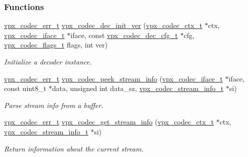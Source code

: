 \subsubsection*{Functions}
\begin{DoxyCompactItemize}
\item 
\hyperlink{group__codec_gada1084710837ad363b92f2379dd2b8d2}{vpx\+\_\+codec\+\_\+err\+\_\+t} \hyperlink{group__decoder_ga6435c3e8cb9408f1c0c3d052a3a577b7}{vpx\+\_\+codec\+\_\+dec\+\_\+init\+\_\+ver} (\hyperlink{group__codec_gad03e2dfa6ae511db7d25be6bbb336233}{vpx\+\_\+codec\+\_\+ctx\+\_\+t} $\ast$ctx, \hyperlink{group__codec_gae99c3b04f4a567a311211cce3ae6b83b}{vpx\+\_\+codec\+\_\+iface\+\_\+t} $\ast$iface, const \hyperlink{group__decoder_ga4a2e808eb43f1e798024b5a409c484f9}{vpx\+\_\+codec\+\_\+dec\+\_\+cfg\+\_\+t} $\ast$cfg, \hyperlink{group__codec_ga3b36d5af89ddc463489fe5bde0a57877}{vpx\+\_\+codec\+\_\+flags\+\_\+t} flags, int ver)
\begin{DoxyCompactList}\small\item\em Initialize a decoder instance. \end{DoxyCompactList}\item 
\hyperlink{group__codec_gada1084710837ad363b92f2379dd2b8d2}{vpx\+\_\+codec\+\_\+err\+\_\+t} \hyperlink{group__decoder_gadfee4664d644175d5aac1465ef11c4b0}{vpx\+\_\+codec\+\_\+peek\+\_\+stream\+\_\+info} (\hyperlink{group__codec_gae99c3b04f4a567a311211cce3ae6b83b}{vpx\+\_\+codec\+\_\+iface\+\_\+t} $\ast$iface, const uint8\+\_\+t $\ast$data, unsigned int data\+\_\+sz, \hyperlink{group__decoder_ga900420e8f7cb9c1b3070b2ba7d636974}{vpx\+\_\+codec\+\_\+stream\+\_\+info\+\_\+t} $\ast$si)
\begin{DoxyCompactList}\small\item\em Parse stream info from a buffer. \end{DoxyCompactList}\item 
\hyperlink{group__codec_gada1084710837ad363b92f2379dd2b8d2}{vpx\+\_\+codec\+\_\+err\+\_\+t} \hyperlink{group__decoder_ga552f1044d36a84e8b05ce6902e9ae8c9}{vpx\+\_\+codec\+\_\+get\+\_\+stream\+\_\+info} (\hyperlink{group__codec_gad03e2dfa6ae511db7d25be6bbb336233}{vpx\+\_\+codec\+\_\+ctx\+\_\+t} $\ast$ctx, \hyperlink{group__decoder_ga900420e8f7cb9c1b3070b2ba7d636974}{vpx\+\_\+codec\+\_\+stream\+\_\+info\+\_\+t} $\ast$si)
\begin{DoxyCompactList}\small\item\em Return information about the current stream. \end{DoxyCompactList}\item 

\end{DoxyCompactItemize}
